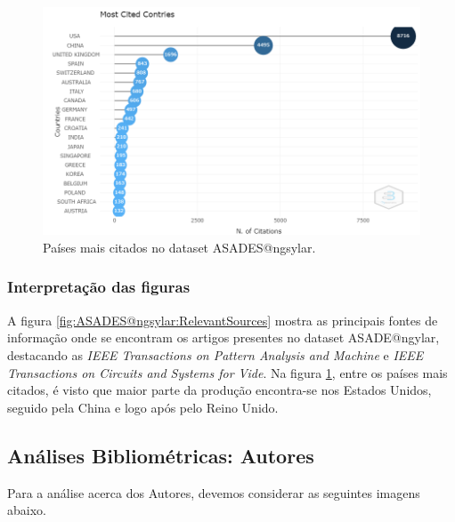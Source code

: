\begin{figure}[H]
    \centering
    \includegraphics[angle=0,width=1\textwidth]{experiments/ngsylar/PesqBibliogr/Imagens/ASADES-MostCitedCountries.png}
    \caption{Países mais citados no dataset ASADES@ngsylar.}
    \label{fig:ASADES@ngsylar:MostCitedCountries}
\end{figure}

\subsubsection{Interpretação das figuras }

A figura \ref{fig:ASADES@ngsylar:RelevantSources} mostra as principais fontes de informação onde se encontram os artigos presentes no dataset ASADE@ngylar, destacando as \textit{IEEE Transactions on Pattern Analysis and Machine} e \textit{IEEE Transactions on Circuits and Systems for Vide}.
Na figura \ref{fig:ASADES@ngsylar:MostCitedCountries}, entre os países mais citados, é visto que maior parte da produção encontra-se nos Estados Unidos, seguido pela China e logo após pelo Reino Unido.



















\subsection{Análises Bibliométricas: Autores}

Para a análise acerca dos Autores, devemos considerar as seguintes imagens abaixo.

